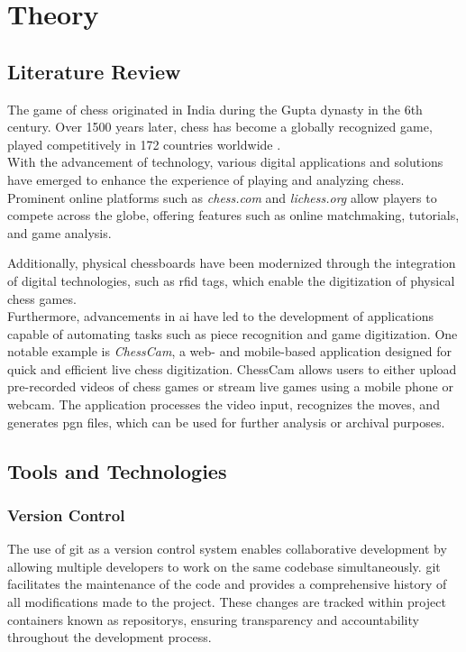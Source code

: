 \chapter{Theory}

\section{Literature Review}

The game of chess originated in India during the Gupta dynasty in the 6th century. Over 1500 years later, chess has become a globally recognized game, played competitively in 172 countries worldwide \cite{artsnculture}. \\

With the advancement of technology, various digital applications and solutions have emerged to enhance the experience of playing and analyzing chess. Prominent online platforms such as \textit{chess.com} and \textit{lichess.org} allow players to compete across the globe, offering features such as online matchmaking, tutorials, and game analysis. 

Additionally, physical chessboards have been modernized through the integration of digital technologies, such as \gls{rfid} tags, which enable the digitization of physical chess games. \cite{quora:shah} \\

Furthermore, advancements in \gls{ai} have led to the development of applications capable of automating tasks such as piece recognition and game digitization. One notable example is \textit{ChessCam}, a web- and mobile-based application designed for quick and efficient live chess digitization. ChessCam allows users to either upload pre-recorded videos of chess games or stream live games using a mobile phone or webcam. The application processes the video input, recognizes the moves, and generates \gls{pgn} files, which can be used for further analysis or archival purposes.

\section{Tools and Technologies}

\subsection{Version Control}

The use of \gls{git} as a version control system enables collaborative development by allowing multiple developers to work on the same codebase simultaneously. \gls{git} facilitates the maintenance of the code and provides a comprehensive history of all modifications made to the project. These changes are tracked within project containers known as \glspl{repository}, ensuring transparency and accountability throughout the development process. \cite{alphaefficiency:git}

